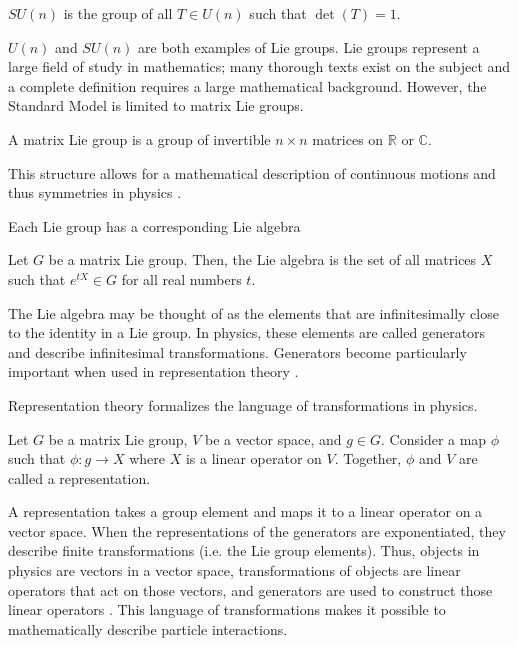 \begin{definition}
$SU(n)$ is the group of all $T \in U(n)$ such that $\det(T) =1$.
\end{definition}
$U(n)$ and $SU(n)$ are both examples of Lie groups. Lie groups represent a large field of study in mathematics; many thorough texts exist on the subject and a complete definition requires a large mathematical background. However, the Standard Model is limited to matrix Lie groups. 

\begin{definition}
A matrix Lie group is a group of invertible $n\times n$ matrices on $\mathbb{R}$ or $\mathbb{C}$.
\end{definition}
This structure allows for a mathematical description of continuous motions and thus symmetries in physics \cite{GroupTheoryBook}.

Each Lie group has a corresponding Lie algebra

\begin{definition}
Let $G$ be a matrix Lie group. Then, the Lie algebra is the set of all matrices $X$ such that $e^{tX}\in G$ for all real numbers $t$.
\end{definition}
The Lie algebra may be thought of as the elements that are infinitesimally close to the identity in a Lie group. In physics, these elements are called generators and describe infinitesimal transformations. Generators become particularly important when used in representation theory \cite{GroupTheoryBook}.

Representation theory formalizes the language of transformations in physics.

\begin{definition}
Let $G$ be a matrix Lie group, $V$ be a vector space, and $g\in G$. Consider a map $\phi$ such that $\phi : g \rightarrow X$ where $X$ is a linear operator on $V$. Together, $\phi$ and $V$ are called a representation.
\end{definition}
A representation takes a group element and maps it to a linear operator on a vector space. When the representations of the generators are exponentiated, they describe finite transformations (i.e. the Lie group elements). Thus, objects in physics are vectors in a vector space, transformations of objects are linear operators that act on those vectors, and generators are used to construct those linear operators \cite{GroupTheoryBook, Peskin}. This language of transformations makes it possible to mathematically describe particle interactions.


